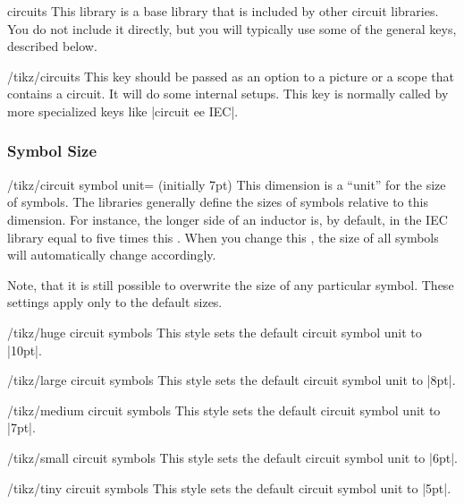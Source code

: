 \begin{tikzlibrary}{circuits}
  This library is a base library that is included by other circuit
  libraries. You do not include it directly, but you will typically
  use some of the general keys, described below.
\end{tikzlibrary}

\begin{key}{/tikz/circuits}
  This key should be passed as an option to a picture or a scope that
  contains a circuit. It will do some internal setups. This key is
  normally called by more specialized keys like |circuit ee IEC|.
\end{key}




\subsubsection{Symbol Size}

\begin{key}{/tikz/circuit symbol unit= (initially 7pt)}
  This dimension is a ``unit'' for the size of symbols. The libraries
  generally define the sizes of symbols relative to this
  dimension. For instance, the longer side of an inductor is, by
  default, in the IEC library equal to five times this
  . When you change this , the size of
  all symbols will automatically change accordingly.

  Note, that it is still possible to overwrite the size of any
  particular symbol. These settings apply only to the default sizes.

\begin{codeexample}[]
\end{codeexample}
\end{key}

\begin{stylekey}{/tikz/huge circuit symbols}
  This style sets the default circuit symbol unit to |10pt|.
\end{stylekey}
\begin{stylekey}{/tikz/large circuit symbols}
  This style sets the default circuit symbol unit to |8pt|.
\end{stylekey}
\begin{stylekey}{/tikz/medium circuit symbols}
  This style sets the default circuit symbol unit to |7pt|.
\end{stylekey}
\begin{stylekey}{/tikz/small circuit symbols}
  This style sets the default circuit symbol unit to |6pt|.
\end{stylekey}
\begin{stylekey}{/tikz/tiny circuit symbols}
  This style sets the default circuit symbol unit to |5pt|.
\end{stylekey}

